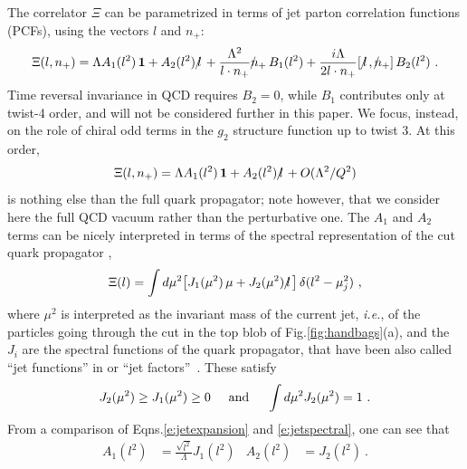 \documentclass[preprintnumbers,floatfix,nofootinbib]{revtex4}
\newcommand{\lslash}{l \hspace{-0.19cm} / \,}
\newcommand{\nslash}{n \hspace{-0.24cm} / \,}
\begin{document}
The correlator $\Xi$ can be parametrized in terms of jet parton correlation
functions (PCFs), using the vectors $l$ and $n_+$: 
\begin{equation}
\Xi(l,n_+) = \Lambda A_1(l^2)\,{\bm 1} + A_2(l^2)\,\lslash 
+ \frac{\Lambda^2}{l \cdot n_{+}} \nslash_+ \, B_{1}(l^2)
+ \frac{i \Lambda}{2 l \cdot n_{+}} [\,\lslash,\nslash_+ ] \, B_{2}(l^2) \ .
\label{e:jetexpansion}
\end{equation} 
Time reversal invariance in QCD requires $B_{2}=0$, while $B_{1}$ contributes
only at twist-4 order, and will not be considered further in this paper. We
focus, instead, on the role of chiral odd terms in the $g_2$ structure function up to twist 3. At this order, 
\begin{equation}
  \Xi(l,n_+) = \Lambda A_1(l^2)\,{\bm 1} + A_2(l^2)\,\lslash 
    + O(\Lambda^2/Q^2)
\label{e:jetexpansion-tw3}
\end{equation} 
is nothing else than the full quark propagator; note however, that we consider
here the full QCD vacuum rather than the perturbative one.  
The $A_1$ and $A_2$ terms can be nicely interpreted in terms of the spectral representation of the cut quark propagator \cite{D'Hoker-lecture-notes,Romao-lecture-notes},
\begin{align} 
  \Xi(l) =  
  \int d \mu^2 \big[ J_1 (\mu^2)\,\mu + J_2 (\mu^2)\,\lslash \big] \,
  \delta(l^2 -\mu_j^2) \ ,
\label{e:jetspectral}
\end{align}
where $\mu^2$ is interpreted as the invariant mass of the current jet, {\it
  i.e.}, of the particles going through the cut in the top blob of
Fig.\ref{fig:handbags}(a), and the $J_i$ are the spectral functions of the
quark propagator, that have been also called ``jet functions'' in
\cite{Accardi:2008ne,SCET?} or ``jet factors''~\cite{Collins:2007ph}. These satisfy
\begin{align}
  J_2(\mu^2) \geq J_1(\mu^2) \geq 0
  \hspace*{0.5cm} \text{and} \hspace*{0.5cm}
  \int d\mu^2 J_2(\mu^2) = 1 \ .
\label{eq:jetfnsprops}
\end{align}
From a comparison of Eqns.\eqref{e:jetexpansion} and \eqref{e:jetspectral}, one can see that 
\begin{align}
  A_1(l^2)&=\frac{\sqrt{l^2}}{\Lambda}J_1(l^2) & A_2(l^2)&=J_2(l^2) \ .
  \label{eq:jet_vs_spectral}
\end{align}
\end{document}
